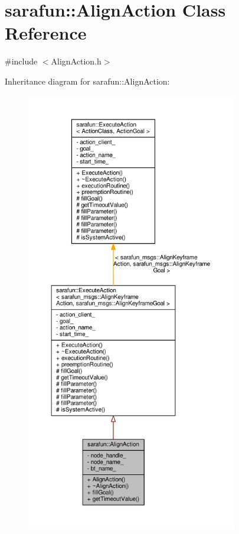 \hypertarget{classsarafun_1_1AlignAction}{\section{sarafun\-:\-:Align\-Action Class Reference}
\label{classsarafun_1_1AlignAction}
}


{\ttfamily \#include $<$Align\-Action.\-h$>$}



Inheritance diagram for sarafun\-:\-:Align\-Action\-:
\nopagebreak
\begin{figure}[H]
\begin{center}
\leavevmode
\includegraphics[height=550pt]{dc/d01/classsarafun_1_1AlignAction__inherit__graph}
\end{center}
\end{figure}


